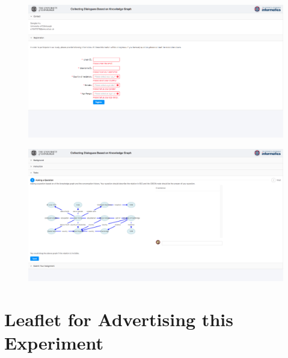 \documentclass[bsc,frontabs,twoside,singlespacing,parskip,deptreport]{infthesis}     %
\begin{document}



\begin{figure}[h]
    \includegraphics[width=\textwidth]{info.png}
    \label{fig:info}
\end{figure}

\begin{figure}[h]
    \includegraphics[width=\textwidth]{work.png}
    \label{fig:work}
\end{figure}

\chapter{Leaflet for Advertising this Experiment}
\label{appendix:leaflet}


\label{}
\end{document}
